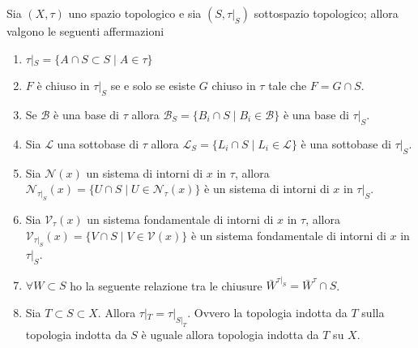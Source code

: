 \begin{theorem}
	\label{thr:proprieties_induced_top}
	Sia $(X,\tau)$ uno spazio topologico e sia $(S, \tau|_S)$ sottospazio topologico; allora valgono le seguenti affermazioni
	\begin{enumerate}
		\item $\tau|_S = \{A \cap S \subset S \; | \; A \in \tau \}$
		\item $F$ è chiuso in $\tau|_S$ se e solo se esiste $G$ chiuso in $\tau$ tale che $F = G \cap S$.
		\item Se $\mathcal{B}$ è una base di $\tau$ allora $\mathcal{B}_S = \{B_i \cap S \; | \; B_i \in \mathcal{B}\}$ è una base di $\tau|_S$.
		\item Sia $\mathcal{L}$ una sottobase di $\tau$ allora $\mathcal{L}_S = \{ L_i \cap S \; | \; L_i \in \mathcal{L}\}$ è una sottobase di $\tau|_S$.
		\item Sia $\mathcal{N}(x)$ un sistema di intorni di $x$ in $\tau$, allora $\mathcal{N}_{\tau|_S}(x) = \{U \cap S \; | \; U \in \mathcal{N}_\tau(x)\}$ è un sistema di intorni di $x$ in $\tau|_S$.
		\item Sia $\mathcal{V}_\tau(x)$ un sistema fondamentale di intorni di $x$ in $\tau$, allora $\mathcal{V}_{\tau|_S}(x) = \{ V \cap S \; | \; V \in \mathcal{V}(x)\}$ è un sistema fondamentale di intorni di $x$ in $\tau|_S$.
		\item $\forall W \subset S$ ho la seguente relazione tra le chiusure $\bar{W}^{\tau|_S} = \bar{W}^{\tau} \cap S$.
		\item Sia $T \subset S \subset X$. Allora $\tau|_T = \tau|_{S|_T}$. Ovvero la topologia indotta da $T$ sulla topologia indotta da $S$ è uguale allora topologia indotta da $T$ su $X$.
	\end{enumerate}
\end{theorem}

